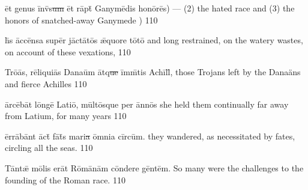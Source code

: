 \documentclass[]{article}
\begin{document}
{\=et g\-en\-us \=inv\={\macron{\i}}s\sout{um }\=et  r\=apt\={\macron{\i}} G\-an\-ym\={\macron e}d\-is h\-on\={\macron o}r\={\macron e}s) ---}
{(2) the hated race and (3) the honors of snatched-away Ganymede )}
{110}
{}
{}

\latline
{h\={\macron{\i}}s \=acc\={\macron e}ns\-a s\-up\=er j\=act\={\macron a}t\={\macron o}s \={\ae}qu\-or\-e t\={\macron o}t\={\macron o}}
{and long restrained, on the watery wastes, on account of these vexations, }
{110}
{}
{}

\latline
{Tr\={\macron o}\=as, r\=el\-iqu\-i\={\macron a}s D\-an\-a\=um \=atq\sout{ue }\=imm\={\macron{\i}}t\-is \-Ach\=ill\={\macron{\i}},}
{those Trojans left by the Dana\"ans and fierce Achilles }
{110}
{}
{}

\latline
{\=arc\={\macron e}b\=at l\=ong\={\macron e} L\-at\-i\={\macron o}, m\=ult\={\macron o}squ\-e p\-er \=ann\={\macron o}s}
{she held them continually far away from Latium, for many years }
{110}
{}
{}

\latline
{\=err\={\macron a}b\=ant \={\macron a}ct\={\macron{\i}} f\={\macron a}t\={\macron{\i}}s m\-ar\-i\sout{a }\=omn\-i\-a c\=irc\=um.}
{they wandered, as necessitated by fates, circling all the seas.}
{110}
{}
{}

\latline
{T\=ant\={\ae} m\={\macron o}l\-is \-er\=at R\={\macron o}m\={\macron a}n\=am c\=ond\-er\-e g\=ent\=em.}
{So many were the challenges to the founding of the Roman race.}
{110}
{}
{}
\end{document}
